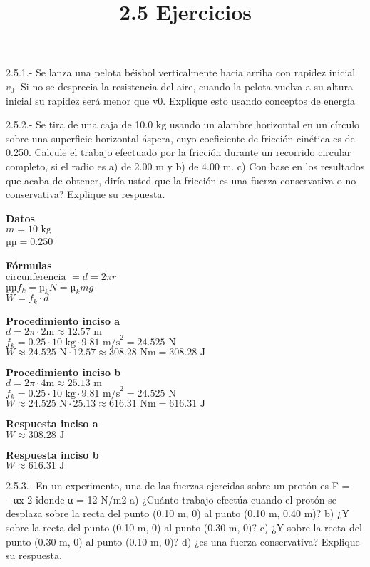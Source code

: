 \documentclass[
]{article}
\title{2.5 Ejercicios}
\author{}
\date{}
\begin{document}
\maketitle

2.5.1.- Se lanza una pelota béisbol verticalmente hacia arriba con
rapidez inicial {\(v_{0}\)}. Si no se desprecia la resistencia del aire,
cuando la pelota vuelva a su altura inicial su rapidez será menor que
v0. Explique esto usando conceptos de energía

2.5.2.- Se tira de una caja de 10.0 kg usando un alambre horizontal en
un círculo sobre una superficie horizontal áspera, cuyo coeficiente de
fricción cinética es de 0.250. Calcule el trabajo efectuado por la
fricción durante un recorrido circular completo, si el radio es a) de
2.00 m y b) de 4.00 m. c) Con base en los resultados que acaba de
obtener, diría usted que la fricción es una fuerza conservativa o no
conservativa? Explique su respuesta.

\textbf{Datos}\\
{\(m = 10\text{~kg}\)}\\
{µ\(µ = 0.250\)}

\textbf{Fórmulas}\\
{\(\text{circunferencia~} = d = 2\pi r\)}\\
{µµ\(f_{k} = µ_{k}N = µ_{k}mg\)}\\
{\(W = f_{k} \cdot d\)}

\textbf{Procedimiento inciso a}\\
{\(d = 2\pi \cdot 2\text{m} \approx 12.57\text{~m}\)}\\
{\(f_{k} = 0.25 \cdot 10\text{~kg} \cdot 9.81\text{~m/s}^{2} = 24.525\text{~N}\)}\\
{\(W \approx 24.525\text{~N} \cdot 12.57 \approx 308.28\text{~Nm} = 308.28\text{~J}\)}

\textbf{Procedimiento inciso b}\\
{\(d = 2\pi \cdot 4\text{m} \approx 25.13\text{~m}\)}\\
{\(f_{k} = 0.25 \cdot 10\text{~kg} \cdot 9.81\text{~m/s}^{2} = 24.525\text{~N}\)}\\
{\(W \approx 24.525\text{~N} \cdot 25.13 \approx 616.31\text{~Nm} = 616.31\text{~J}\)}

\textbf{Respuesta inciso a}\\
{\(W \approx 308.28\text{~J}\)}

\textbf{Respuesta inciso b}\\
{\(W \approx 616.31\text{~J}\)}

2.5.3.- En un experimento, una de las fuerzas ejercidas sobre un protón
es F⃗ = −αx 2 îdonde α = 12 N/m2 a) ¿Cuánto trabajo efectúa cuando el
protón se desplaza sobre la recta del punto (0.10 m, 0) al punto (0.10
m, 0.40 m)? b) ¿Y sobre la recta del punto (0.10 m, 0) al punto (0.30 m,
0)? c) ¿Y sobre la recta del punto (0.30 m, 0) al punto (0.10 m, 0)? d)
¿es una fuerza conservativa? Explique su respuesta.
\end{document}
